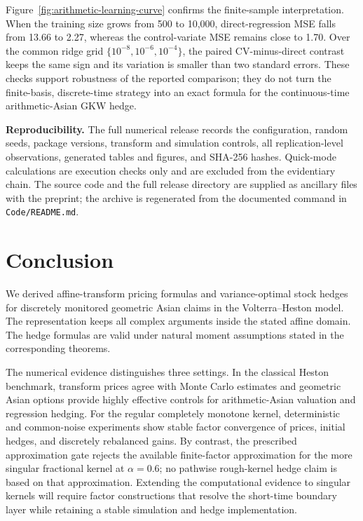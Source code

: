 \documentclass[10pt,a4paper,reqno]{amsart}
\theoremstyle{plain}
\theoremstyle{definition}
\theoremstyle{remark}
\theoremstyle{example}
\begin{document}
 Figure~\ref{fig:arithmetic-learning-curve} confirms the finite-sample interpretation.  When the
training size grows from 500 to 10,000, direct-regression MSE falls from 13.66 to 2.27, whereas the
control-variate  MSE remains close to 1.70.  Over the common ridge grid
\(\{10^{-8},10^{-6},10^{-4}\}\), the  paired CV-minus-direct contrast keeps the same sign and its
variation is smaller than two standard errors.  These checks support robustness of the reported
comparison; they do not turn the finite-basis, discrete-time strategy into an exact formula for the
continuous-time arithmetic-Asian GKW hedge.

\medskip
\noindent\textbf{ Reproducibility. }
The full numerical release records the configuration, random seeds, package versions, transform
and simulation controls, all replication-level observations, generated tables and figures, and
SHA-256 hashes.  Quick-mode calculations are execution checks only and are excluded from the
evidentiary chain. The source code and the full release directory are supplied as ancillary files
with the preprint; the archive is regenerated from the documented command in
\texttt{Code/README.md}.

\section{Conclusion}\label{sec:conclusion}

We derived affine-transform pricing formulas and variance-optimal stock hedges for discretely
monitored geometric Asian claims in the Volterra--Heston model. The representation keeps all complex arguments inside the stated affine domain. The hedge formulas are valid under natural moment assumptions stated in the corresponding theorems.

The numerical evidence distinguishes three settings. In the classical Heston benchmark, transform
prices agree with Monte Carlo estimates and geometric Asian options provide highly effective
controls for arithmetic-Asian valuation and regression hedging. For the regular completely
monotone kernel, deterministic and common-noise experiments show stable factor convergence of
prices, initial hedges, and discretely rebalanced gains. By contrast, the prescribed approximation
gate rejects the available finite-factor approximation for the more singular fractional kernel at
\(\alpha=0.6\); no pathwise rough-kernel hedge claim is based on that approximation. Extending the
computational evidence to singular kernels will require factor constructions that resolve the
short-time boundary layer while retaining a stable simulation and hedge implementation.
\end{document}
